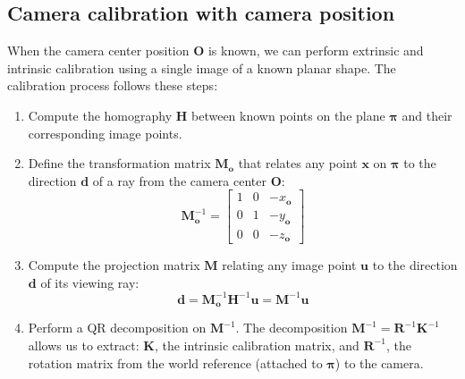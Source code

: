 \subsection{Camera calibration with camera position}
When the camera center position $\mathbf{O}$ is known, we can perform extrinsic and intrinsic calibration using a single image of a known planar shape. 
The calibration process follows these steps:
\begin{enumerate}
    \item Compute the homography $\mathbf{H}$ between known points on the plane $\boldsymbol{\pi}$ and their corresponding image points.
    \item Define the transformation matrix $\mathbf{M}_{\mathbf{o}}$ that relates any point $\mathbf{x}$ on $\boldsymbol{\pi}$ to the direction $\mathbf{d}$ of a ray from the camera center $\mathbf{O}$:
        \[\mathbf{M}_{\mathbf{o}}^{-1}=\begin{bmatrix} 1 & 0 & -x_{\mathbf{o}} \\ 0 & 1 & -y_{\mathbf{o}} \\ 0 & 0 & -z_{\mathbf{o}} \end{bmatrix}\]
    \item Compute the projection matrix $\mathbf{M}$ relating any image point $\mathbf{u}$ to the direction $\mathbf{d}$ of its viewing ray: 
        \[\mathbf{d}=\mathbf{M}_{\mathbf{o}}^{-1}\mathbf{H}^{-1}\mathbf{u}=\mathbf{M}^{-1}\mathbf{u}\]
    \item Perform a QR decomposition on $\mathbf{M}^{-1}$. 
        The decomposition $\mathbf{M}^{-1}=\mathbf{R}^{-1}\mathbf{K}^{-1}$ allows us to extract: $\mathbf{K}$, the intrinsic calibration matrix, and $\mathbf{R}^{-1}$, the rotation matrix from the world reference (attached to $\boldsymbol{\pi}$) to the camera.
\end{enumerate}

